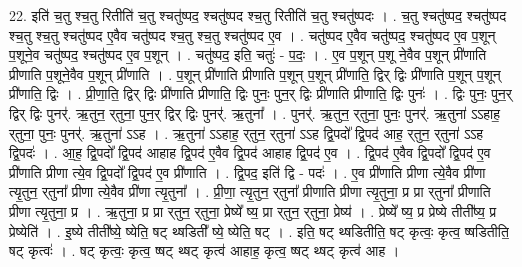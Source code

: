 \documentclass[17pt]{extarticle}
\begin{document}
22. इति॑ च॒तु श्च॒तु रितीति॑ च॒तु श्चतु॑ष्पद॒ श्चतु॑ष्पद श्च॒तु रितीति॑ च॒तु श्चतु॑ष्पदः । . च॒तु श्चतु॑ष्पद॒ श्चतु॑ष्पद श्च॒तु श्च॒तु श्चतु॑ष्पद ए॒वैव चतु॑ष्पद श्च॒तु श्च॒तु श्चतु॑ष्पद ए॒व । . चतु॑ष्पद ए॒वैव चतु॑ष्पद॒ श्चतु॑ष्पद ए॒व प॒शून् प॒शूने॒व चतु॑ष्पद॒ श्चतु॑ष्पद ए॒व प॒शून् । . चतु॑ष्पद॒ इति॒ चतुः॑ - प॒दः॒ । . ए॒व प॒शून् प॒शू ने॒वैव प॒शून् प्री॑णाति प्रीणाति प॒शूने॒वैव प॒शून् प्री॑णाति । . प॒शून् प्री॑णाति प्रीणाति प॒शून् प॒शून् प्री॑णाति॒ द्विर् द्विः प्री॑णाति प॒शून् प॒शून् प्री॑णाति॒ द्विः । . प्री॒णा॒ति॒ द्विर् द्विः प्री॑णाति प्रीणाति॒ द्विः पुनः॒ पुन॒र् द्विः प्री॑णाति प्रीणाति॒ द्विः पुनः॑ । . द्विः पुनः॒ पुन॒र् द्विर् द्विः पुनर्॑. ऋ॒तुन॒ र्‌तुना॒ पुन॒र् द्विर् द्विः पुनर्॑. ऋ॒तुना᳚ । . पुनर्॑. ऋ॒तुन॒ र्‌तुना॒ पुनः॒ पुनर्॑. ऋ॒तुना॑ ऽऽहाह॒ र्‌तुना॒ पुनः॒ पुनर्॑. ऋ॒तुना॑ ऽऽह । . ऋ॒तुना॑ ऽऽहाह॒ र्‌तुन॒ र्‌तुना॑ ऽऽह द्वि॒पदो᳚ द्वि॒पद॑ आह॒ र्‌तुन॒ र्‌तुना॑ ऽऽह द्वि॒पदः॑ । . आ॒ह॒ द्वि॒पदो᳚ द्वि॒पद॑ आहाह द्वि॒पद॑ ए॒वैव द्वि॒पद॑ आहाह द्वि॒पद॑ ए॒व । . द्वि॒पद॑ ए॒वैव द्वि॒पदो᳚ द्वि॒पद॑ ए॒व प्री॑णाति प्रीणा त्ये॒व द्वि॒पदो᳚ द्वि॒पद॑ ए॒व प्री॑णाति । . द्वि॒पद॒ इति॑ द्वि - पदः॑ । . ए॒व प्री॑णाति प्रीणा त्ये॒वैव प्री॑णा त्यृ॒तुन॒ र्‌तुना᳚ प्रीणा त्ये॒वैव प्री॑णा त्यृ॒तुना᳚ । . प्री॒णा॒ त्यृ॒तुन॒ र्‌तुना᳚ प्रीणाति प्रीणा त्यृ॒तुना॒ प्र प्रा र्‌तुना᳚ प्रीणाति प्रीणा त्यृ॒तुना॒ प्र । . ऋ॒तुना॒ प्र प्रा र्‌तुन॒ र्‌तुना॒ प्रेष्ये᳚ ष्य॒ प्रा र्‌तुन॒ र्‌तुना॒ प्रेष्य॑ । . प्रेष्ये᳚ ष्य॒ प्र प्रेष्ये तीती᳚ष्य॒ प्र प्रेष्येति॑ । . इ॒ष्ये तीती᳚ष्ये॒ ष्येति॒ षट् थ्षडिती᳚ ष्ये॒ ष्येति॒ षट् । . इति॒ षट् थ्षडितीति॒ षट् कृत्वः॒ कृत्व॒ ष्षडितीति॒ षट् कृत्वः॑ । . षट् कृत्वः॒ कृत्व॒ ष्षट् थ्षट् कृत्व॑ आहाह॒ कृत्व॒ ष्षट् थ्षट् कृत्व॑ आह । \newline
\end{document}
